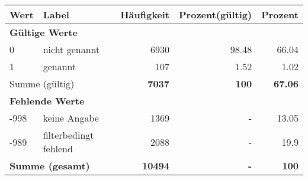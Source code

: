      \begin{longtable}{lXrrr}
     \toprule
     \textbf{Wert} & \textbf{Label} & \textbf{Häufigkeit} & \textbf{Prozent(gültig)} & \textbf{Prozent} \\
     \endhead
     \midrule
     \multicolumn{5}{l}{\textbf{Gültige Werte}}\\

     0 &
     \multicolumn{1}{X}{ nicht genannt   } &


       \num{6930} &
       \num[round-mode=places,round-precision=2]{98.48} &
         \num[round-mode=places,round-precision=2]{66.04} \\

     1 &
     \multicolumn{1}{X}{ genannt   } &


       \num{107} &
       \num[round-mode=places,round-precision=2]{1.52} &
         \num[round-mode=places,round-precision=2]{1.02} \\
     \midrule
     \multicolumn{2}{l}{Summe (gültig)} &
       \textbf{\num{7037}} &
     \textbf{\num{100}} &
       \textbf{\num[round-mode=places,round-precision=2]{67.06}} \\
     \multicolumn{5}{l}{\textbf{Fehlende Werte}}\\
       -998 &
       keine Angabe &
         \num{1369} &
        - &
         \num[round-mode=places,round-precision=2]{13.05} \\
       -989 &
       filterbedingt fehlend &
         \num{2088} &
        - &
         \num[round-mode=places,round-precision=2]{19.9} \\
     \midrule
     \multicolumn{2}{l}{\textbf{Summe (gesamt)}} &
          \textbf{\num{10494}} &
        \textbf{-} &
        \textbf{\num{100}} \\
     \bottomrule
     \end{longtable}
     
